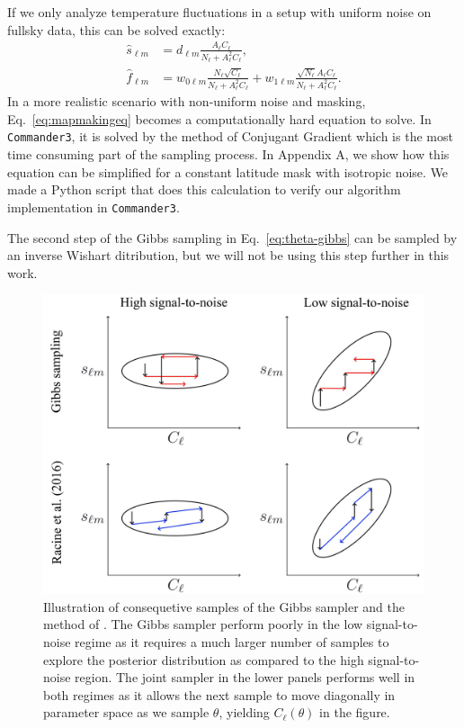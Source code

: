 \documentclass[twocolumn]{../common/aa}
\def\commanderthree{\texttt{Commander3}}
\begin{document}
If we only analyze temperature fluctuations in a setup with uniform noise on fullsky data, this can be solved exactly:
\begin{align}
    \hat{s}_{\ell m} &= d_{\ell m}\frac{A_{\ell}C_{\ell}}{N_\ell + A_{\ell}^2C_{\ell}},\\
    \hat{f}_{\ell m} &= w_{0\ell m}\frac{N_{\ell}\sqrt{C_{\ell}}}{N_\ell + A_{\ell}^2C_{\ell}}+w_{1\ell m}\frac{\sqrt{N_{\ell}}A_{\ell}C_\ell}{N_\ell + A_{\ell}^2C_{\ell}}.
\end{align}
In a more realistic scenario with non-uniform noise and masking, Eq.~\eqref{eq:mapmakingeq} becomes a computationally hard equation to solve. In \commanderthree, it is solved by the method of Conjugant Gradient which is the most time consuming part of the sampling process. In Appendix A, we show how this equation can be simplified for a constant latitude mask with isotropic noise. We made a Python script that does this calculation to verify our algorithm implementation in \commanderthree.

The second step of the Gibbs sampling in Eq.~\eqref{eq:theta-gibbs} can be sampled by an inverse Wishart ditribution, but we will not be using this step further in this work.

\begin{figure}
	\centering
	\includegraphics[width=\linewidth]{figures/parameter-estimation.jpg}
	\caption{\label{fig:illustration}Illustration of consequetive samples of the Gibbs sampler and the method of \cite{racine:2016}. The Gibbs sampler perform poorly in the low signal-to-noise regime as it requires a much larger number of samples to explore the posterior distribution as compared to the high signal-to-noise region. The joint sampler in the lower panels performs well in both regimes as it allows the next sample to move diagonally in parameter space as we sample $\theta$, yielding $C_\ell(\theta)$ in the figure.}
\end{figure}
\end{document}
